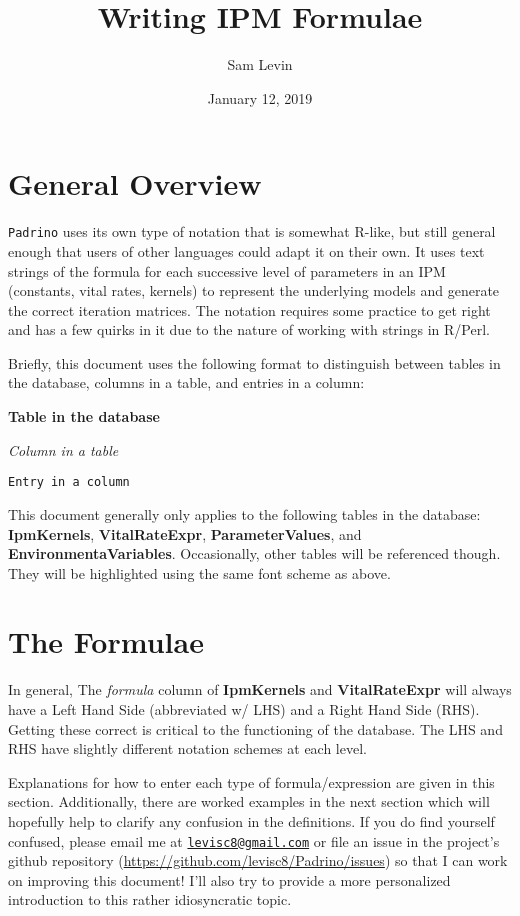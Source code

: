 \documentclass[]{article}
\title{Writing IPM Formulae}
\author{Sam Levin}
\date{January 12, 2019}
\begin{document}
\maketitle

{
\setcounter{tocdepth}{3}
\tableofcontents
}
\section{General Overview}\label{general-overview}

\texttt{Padrino} uses its own type of notation that is somewhat R-like,
but still general enough that users of other languages could adapt it on
their own. It uses text strings of the formula for each successive level
of parameters in an IPM (constants, vital rates, kernels) to represent
the underlying models and generate the correct iteration matrices. The
notation requires some practice to get right and has a few quirks in it
due to the nature of working with strings in R/Perl.

Briefly, this document uses the following format to distinguish between
tables in the database, columns in a table, and entries in a column:

\textbf{Table in the database}

\emph{Column in a table}

\texttt{Entry\ in\ a\ column}

This document generally only applies to the following tables in the
database: \textbf{IpmKernels}, \textbf{VitalRateExpr},
\textbf{ParameterValues}, and \textbf{EnvironmentaVariables}.
Occasionally, other tables will be referenced though. They will be
highlighted using the same font scheme as above.

\section{The Formulae}\label{the-formulae}

In general, The \emph{formula} column of \textbf{IpmKernels} and
\textbf{VitalRateExpr} will always have a Left Hand Side (abbreviated w/
LHS) and a Right Hand Side (RHS). Getting these correct is critical to
the functioning of the database. The LHS and RHS have slightly different
notation schemes at each level.

Explanations for how to enter each type of formula/expression are given
in this section. Additionally, there are worked examples in the next
section which will hopefully help to clarify any confusion in the
definitions. If you do find yourself confused, please email me at
\href{mailto:levisc8@gmail.com}{\nolinkurl{levisc8@gmail.com}} or file
an issue in the project's github repository
(\url{https://github.com/levisc8/Padrino/issues}) so that I can work on
improving this document! I'll also try to provide a more personalized
introduction to this rather idiosyncratic topic.
\end{document}
